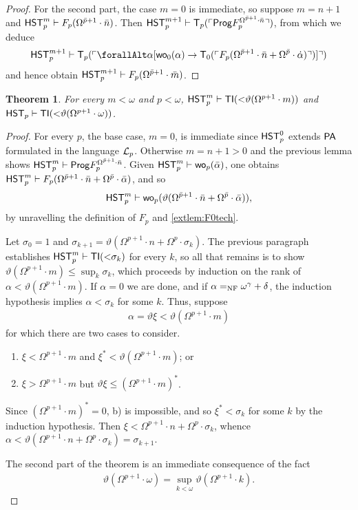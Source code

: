\documentclass[UKenglish,cleveref,DIV=12]{scrartcl}
\let\forall\forallAlt
\newtheorem{theorem}{Theorem}
\theoremstyle{definition}
\theoremstyle{definition}
\begin{document}
\begin{proof}
For the second part, the case $m=0$ is immediate, so suppose $m=n+1$ and $\mathsf{HST}_p^m\vdash
F_p(\Omega^{\bar p+1}\cdot\bar n)$. Then
$\mathsf{HST}_p^{m+1}\vdash\mathsf{T}_p(\ulcorner{\mathsf{Prog}F_p^{\Omega^{\bar p+1}\cdot\bar n}}\urcorner)$, from which we deduce
\begin{align*}
  \HST_p^{m+1}\proves\T_p(\gn{\forall\alpha[\wo_0(\alpha)\rightarrow\T_0(\gn{F_p(\Omega^{\bar p+1}\cdot\bar n+\Omega^{\bar p}\cdot\dot\alpha)})]})
\end{align*}
and hence obtain $\mathsf{HST}_p^{m+1}\vdash F_p(\Omega^{\bar p+1}\cdot\bar m)$.
\end{proof}
\begin{theorem}\label{extthm:Fplowerbound}
 For every $m<\omega$ and $p<\omega$,
$\mathsf{HST}_p^{m}\vdash\mathsf{TI}(\mathord<\vartheta(\Omega^{p+1}\cdot m))$ and
$\mathsf{HST}_p\vdash\mathsf{TI}(\mathord<\vartheta(\Omega^{p+1}\cdot\omega))$.
\end{theorem}
\begin{proof}
For every $p$, the base case, $m=0$, is immediate since $\mathsf{HST}_p^0$ extends $\mathsf{PA}$
formulated in the language $\mathcal{L}_p$. Otherwise $m=n+1>0$ and the previous lemma
shows $\mathsf{HST}_p^m\vdash\mathsf{Prog} F_p^{\Omega^{\bar p+1}\cdot\bar n}$. Given $\mathsf{HST}_p^m\vdash
\mathsf{wo}_p(\bar \alpha)$, one obtains $\mathsf{HST}_p^m\vdash F_p(\Omega^{\bar p+1}\cdot\bar
n+\Omega^{\bar p}\cdot\bar\alpha)$, and so
\begin{align*}
  \mathsf{HST}_p^m\vdash\mathsf{wo}_p(\vartheta(\Omega^{\bar p+1}\cdot\bar n+\Omega^{\bar p}\cdot\bar\alpha)),
\end{align*}
by unravelling the definition of $F_p$ and \cref{extlem:F0tech}.

Let $\sigma_0=1$ and $\sigma_{k+1}=\vartheta(\Omega^{p+1}\cdot
n+\Omega^p\cdot\sigma_k)$. The previous paragraph establishes $\mathsf{HST}_p^m\vdash
\mathsf{TI}(\mathord<\sigma_k)$ for every $k$, so all that remains is to show
$\vartheta(\Omega^{p+1}\cdot m)\le\sup_k\sigma_k$, which proceeds by induction
on the rank of $\alpha<\vartheta(\Omega^{p+1}\cdot m)$. If $\alpha=0$ we are
done, and if $\alpha=_{\mathrm{NF}}\omega^\gamma+\delta$, the induction hypothesis implies
$\alpha<\sigma_k$ for some $k$. Thus, suppose
\begin{gather*}
  \alpha=\vartheta\xi<\vartheta(\Omega^{p+1}\cdot m)
\end{gather*}
for which there are two cases to consider.
\begin{enumerate}
 \item $\xi<\Omega^{p+1}\cdot m$ and $\xi^*<\vartheta(\Omega^{p+1}\cdot m)$; or
 \item $\xi>\Omega^{p+1}\cdot m$ but $\vartheta\xi\le(\Omega^{p+1}\cdot m)^*$.
\end{enumerate}
Since $(\Omega^{p+1}\cdot m)^*=0$, b) is impossible, and so
$\xi^*<\sigma_k$ for some $k$ by the induction hypothesis. Then
$\xi<\Omega^{p+1}\cdot n+\Omega^p\cdot\sigma_k$, whence
$\alpha<\vartheta(\Omega^{p+1}\cdot n+\Omega^p\cdot\sigma_k)=\sigma_{k+1}$.

The second part of the theorem is an immediate consequence of the fact
\begin{align*}
  \vartheta(\Omega^{p+1}\cdot \omega)=\sup_{k<\omega}\vartheta(\Omega^{p+1}\cdot k).
\end{align*}
\end{proof}
\end{document}
